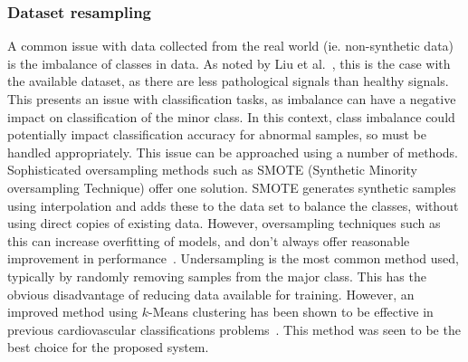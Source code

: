 \documentclass[titlepage, 12pt]{scrartcl} \usepackage{enumitem}
\begin{document}
\subsubsection{Dataset resampling}\label{Resample}
A common issue with data collected from the real world (ie. non-synthetic data)
is the imbalance of classes in data. As noted by Liu et
al.~\parencite{Liu2016}, this is the case with the available dataset, as there
are less pathological signals than healthy signals.  This presents an issue
with classification tasks, as imbalance can have a negative impact on
classification of the minor class. In this context, class imbalance could
potentially impact classification accuracy for abnormal samples, so must be
handled appropriately. This issue can be approached using a number of methods.
Sophisticated oversampling methods such as SMOTE (Synthetic Minority
oversampling Technique) offer one solution. SMOTE generates synthetic samples
using interpolation and adds these to the data set to balance the classes,
without using direct copies of existing data. However, oversampling techniques
such as this can increase overfitting of models, and don't always offer
reasonable improvement in performance~\parencite{Longadge2013}.  Undersampling
is the most common method used, typically by randomly removing samples from the
major class. This has the obvious disadvantage of reducing data available for
training. However, an improved method using $k$-Means clustering has been shown
to be effective in previous cardiovascular classifications
problems~\parencite{Rahman2013}. This method was seen to be the best choice for
the proposed system.
\end{document}
